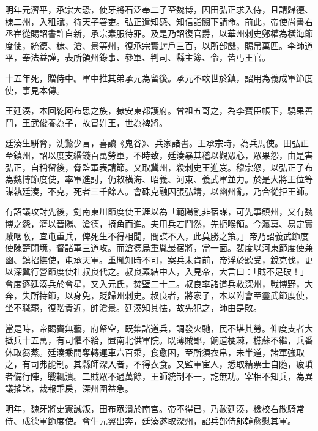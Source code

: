 \begin{pinyinscope}
 明年元濟平，承宗大恐，使牙將石泛奉二子至魏博，因田弘正求入侍，且請歸德、棣二州，入租賦，待天子署吏。弘正遣知感、知信詣闕下請命。前此，帝使尚書右丞崔從賜詔書許自新，承宗素服待罪。及是乃詔復官爵，以華州刺史鄭權為橫海節度使，統德、棣、滄、景等州，復承宗實封戶三百，以所部饑，賜帛萬匹。李師道平，奉法益謹，表所領州錄事、參軍、判司、縣主簿、令，皆丐王官。



 十五年死，贈侍中。軍中推其弟承元為留後。承元不敢世於鎮，詔用為義成軍節度使，事見本傳。



 王廷湊，本回紇阿布思之族，隸安東都護府。曾祖五哥之，為李寶臣帳下，驍果善鬥，王武俊養為子，故冒姓王，世為裨將。



 廷湊生駢脅，沈鷙少言，喜讀《鬼谷》、兵家諸書。王承宗時，為兵馬使。田弘正至鎮州，詔以度支緡錢百萬勞軍，不時致，廷湊暴其稽以觀眾心，眾果怨，由是害弘正，自稱留後，脅監軍表請節。又取冀州，殺刺史王進岌。穆宗怒，以弘正子布為魏博節度使，率軍進討，仍敕橫海、昭義、河東、義武軍並力。於是大將王位等謀執廷湊，不克，死者三千餘人。會硃克融囚張弘靖，以幽州亂，乃合從拒王師。



 有詔議攻討先後，劍南東川節度使王涯以為「範陽亂非宿謀，可先事鎮州，又有魏博之怨，濟以晉陽、滄德，掎角而進。夫用兵若鬥然，先扼喉領。今瀛莫、易定實賊咽喉，宜屯重兵，俾死生不得相聞，間諜不入，此莫勝之策。」帝乃詔義武節度使陳楚閉境，督諸軍三道攻。而滄德烏重胤最宿將，當一面。裴度以河東節度使兼幽、鎮招撫使，屯承天軍。重胤知時不可，案兵未肯前，帝浮於聽受，銳克伐，更以深冀行營節度使杜叔良代之。叔良素結中人，入見帝，大言曰：「賊不足破！」會度逐廷湊兵於會星，又入元氏，焚壁二十二。叔良率諸道兵救深州，戰博野，大奔，失所持節，以身免，貶歸州刺史。叔良者，將家子，本以附會至靈武節度使，坐不職罷，復階貴近，帥滄景。廷湊知其怯，故先犯之，師由是敗。



 當是時，帝賜賚無藝，府帑空，既集諸道兵，調發火馳，民不堪其勞。仰度支者大抵兵十五萬，有司懼不給，置南北供軍院。既薄賊鄙，餉道梗棘，樵蘇不繼，兵番休取芻蒸。廷湊乘間奪轉運車六百乘，食愈困，至所須衣帛，未半道，諸軍強取之，有司弗能制。其縣師深入者，不得衣食。又監軍宦人，悉取精票士自隨，疲瑣者備行陣，戰輒潰。二賊眾不過萬餘，王師統制不一，訖無功。宰相不知兵，為異議搖訹，裁報乖戾，深州圍益急。



 明年，魏牙將史憲誠叛，田布眾潰於南宮。帝不得已，乃赦廷湊，檢校右散騎常侍、成德軍節度使。會牛元翼出奔，廷湊遂取深州，詔兵部侍郎韓愈慰其軍。




\end{pinyinscope}
